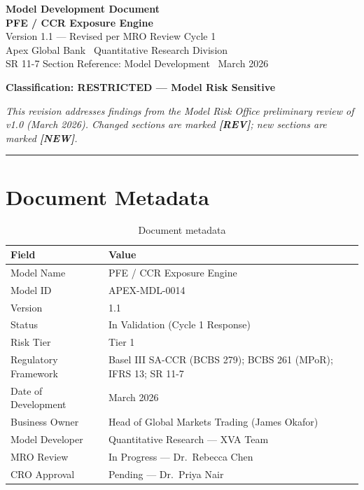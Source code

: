 \documentclass[11pt,a4paper]{article}
\begin{document}

\begin{center}
  {\LARGE\bfseries\color{apexblue} Model Development Document}\\[0.4em]
  {\Large\bfseries PFE / CCR Exposure Engine}\\[0.3em]
  {\large Version 1.1 --- Revised per MRO Review Cycle 1}\\[0.6em]
  {\normalsize Apex Global Bank \textbar\ Quantitative Research Division}\\[0.2em]
  {\small\color{apexgray} SR 11-7 Section Reference: Model Development \textbar\ March 2026}
\end{center}

\vspace{1em}
\textcolor{apexred}{\textbf{Classification: RESTRICTED --- Model Risk Sensitive}}
\vspace{0.5em}

\textcolor{apexgray}{\small\textit{This revision addresses findings from the Model Risk Office
preliminary review of v1.0 (March 2026). Changed sections are marked \textbf{[REV]};
new sections are marked \textbf{[NEW]}.}}
\vspace{1em}

\hrule
\vspace{1em}

\section{Document Metadata}

\begin{table}[h!]
\centering
\begin{tabular}{@{}ll@{}}
\toprule
\textbf{Field} & \textbf{Value} \\
\midrule
Model Name           & PFE / CCR Exposure Engine \\
Model ID             & APEX-MDL-0014 \\
Version              & 1.1 \\
Status               & In Validation (Cycle 1 Response) \\
Risk Tier            & Tier 1 \\
Regulatory Framework & Basel III SA-CCR (BCBS 279); BCBS 261 (MPoR); IFRS 13; SR 11-7 \\
Date of Development  & March 2026 \\
Business Owner       & Head of Global Markets Trading (James Okafor) \\
Model Developer      & Quantitative Research --- XVA Team \\
MRO Review           & In Progress --- Dr.\ Rebecca Chen \\
CRO Approval         & Pending --- Dr.\ Priya Nair \\
\bottomrule
\end{tabular}
\caption{Document metadata}
\end{table}
\end{document}
